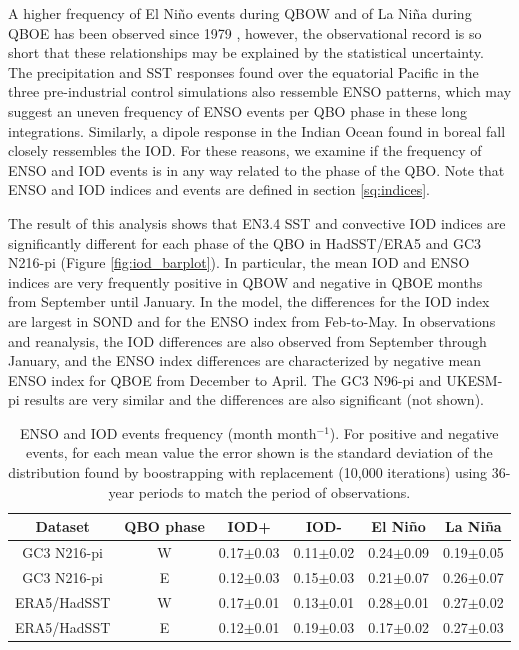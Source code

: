 A higher frequency of El Niño events during QBOW and of La Niña during QBOE has been observed since 1979 \citep{taguchi2010,liess2012}, however, the observational record is so short that these relationships may be explained by the statistical uncertainty. 
The precipitation and SST responses found over the equatorial Pacific in the three pre-industrial control simulations also ressemble ENSO patterns, which may suggest an uneven frequency of ENSO events per QBO phase in these long integrations. 
Similarly, a dipole response in the Indian Ocean found in boreal fall closely ressembles the IOD. For these reasons, we examine if the frequency of ENSO and IOD events is in any way related to the phase of the QBO. Note that ENSO and IOD indices and events are defined in section \ref{sq:indices}. %
 


The result of this analysis shows that EN3.4 SST and convective IOD indices are significantly different for each phase of the QBO in HadSST/ERA5 and GC3 N216-pi (Figure \ref{fig:iod_barplot}). 
 In particular, the mean IOD and ENSO indices are very frequently positive in QBOW and negative in QBOE months from September until January. In the model, the differences for the IOD index are largest in SOND and for the ENSO index from Feb-to-May. In observations and reanalysis, the IOD differences are also observed from September through January, and the ENSO index differences are characterized by negative mean ENSO index for QBOE from December to April. 
 The GC3 N96-pi and UKESM-pi results are very similar and the differences are also significant (not shown). %

\begin{table}[t!]
\caption{ENSO and IOD events frequency (month month$^{-1}$). For positive and negative events, for each mean value the error shown is the standard deviation of the distribution found by boostrapping with replacement (10,000 iterations) using 36-year periods to match the period of observations.}\label{t1}
\begin{center}
\begin{tabular}{cccccc}
\hline\hline
Dataset & QBO phase & IOD+ & IOD- & El Niño & La Niña \\
\hline
GC3 N216-pi & W & 0.17$\pm$0.03	 & 0.11$\pm$0.02	& 0.24$\pm$0.09 & 0.19$\pm$0.05\\
GC3 N216-pi & E & 0.12$\pm$0.03 	 & 0.15$\pm$0.03  & 0.21$\pm$0.07 & 0.26$\pm$0.07 \\
ERA5/HadSST & W & 0.17$\pm$0.01  &0.13$\pm$0.01 & 0.28$\pm$0.01 & 0.27$\pm$0.02\\
ERA5/HadSST & E &0.12$\pm$0.01 & 0.19$\pm$0.03 & 0.17$\pm$0.02 & 0.27$\pm$0.03\\
\hline
\end{tabular}
\end{center}
\end{table}

